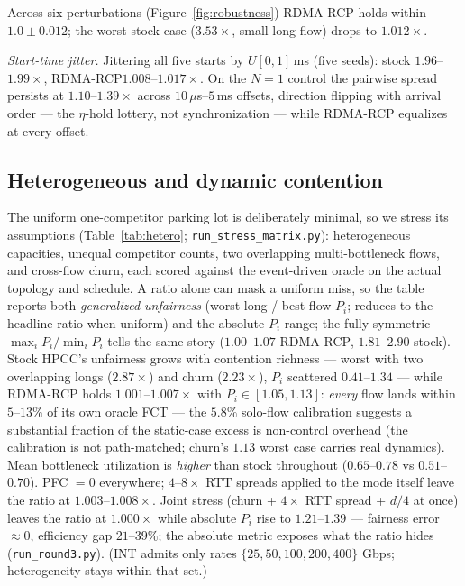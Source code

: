 \documentclass[conference]{IEEEtran}
\newcommand{\hpccfs}{\textsc{RDMA-RCP}\xspace}
\begin{document}
Across six perturbations (Figure~\ref{fig:robustness}) \hpccfs holds within
$1.0 \pm 0.012$; the worst stock case ($3.53\times$, small long flow) drops to
$1.012\times$.

\emph{Start-time jitter.} Jittering all five starts by $U[0,1]$\,ms (five seeds): stock
$1.96$--$1.99\times$, \hpccfs $1.008$--$1.017\times$. On the $N{=}1$ control the pairwise
spread persists at $1.10$--$1.39\times$ across $10\,\mu$s--$5$\,ms offsets, direction
flipping with arrival order --- the $\eta$-hold lottery, not synchronization --- while
\hpccfs equalizes at every offset.

\subsection{Heterogeneous and dynamic contention}
\label{sec:hetero}

The uniform one-competitor parking lot is deliberately minimal, so we stress its assumptions
(Table~\ref{tab:hetero}; \texttt{run\_stress\_matrix.py}): heterogeneous capacities, unequal
competitor counts, two overlapping multi-bottleneck flows, and cross-flow churn, each
scored against the event-driven oracle on the actual topology and schedule.
A ratio alone can mask a uniform miss, so the table reports both \emph{generalized
unfairness} (worst-long / best-flow $P_i$; reduces to the headline ratio when uniform) and the
absolute $P_i$ range; the fully symmetric
$\max_i P_i / \min_i P_i$ tells the same story ($1.00$--$1.07$ \hpccfs, $1.81$--$2.90$
stock).
Stock HPCC's unfairness grows with contention richness --- worst with two overlapping longs
($2.87\times$) and churn ($2.23\times$), $P_i$ scattered $0.41$--$1.34$ --- while \hpccfs
holds
$1.001$--$1.007\times$ with $P_i \in [1.05, 1.13]$: \emph{every} flow lands within
$5$--$13\%$ of its own oracle FCT --- the $5.8\%$ solo-flow calibration
suggests a substantial fraction of the static-case excess is non-control overhead (the
calibration is not path-matched; churn's $1.13$ worst case carries real dynamics). Mean
bottleneck utilization is \emph{higher} than stock throughout ($0.65$--$0.78$ vs
$0.51$--$0.70$). PFC $= 0$ everywhere; $4$--$8\times$ RTT spreads applied to the mode itself
leave the ratio at $1.003$--$1.008\times$. Joint stress (churn + $4\times$ RTT spread + $d/4$ at once) leaves the ratio at
$1.000\times$ while absolute $P_i$ rise to $1.21$--$1.39$ --- fairness error ${\approx}0$,
efficiency gap $21$--$39\%$; the absolute metric exposes what the ratio hides
(\texttt{run\_round3.py}). (INT admits only rates $\{25,50,100,200,400\}$ Gbps; heterogeneity stays within that
set.)
\end{document}

